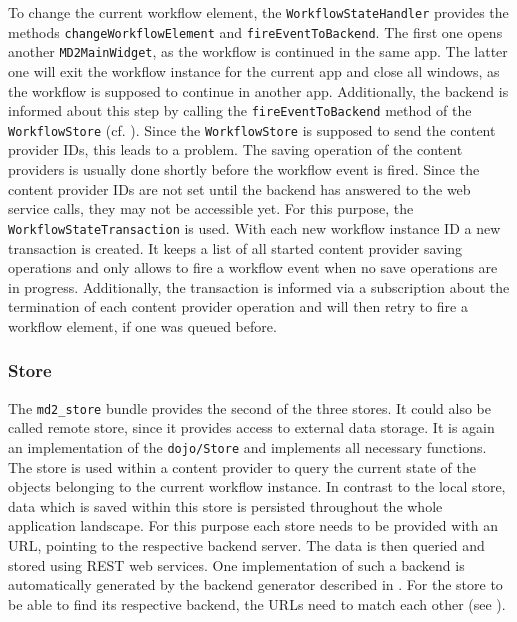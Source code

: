 To change the current workflow element, the \lstinline|WorkflowStateHandler| provides the methods \lstinline|changeWorkflowElement| and \lstinline|fireEventToBackend|. 
The first one opens another \lstinline|MD2MainWidget|, as the workflow is continued in the same app.
The latter one will exit the workflow instance for the current app and close all windows, as the workflow is supposed to continue in another app. Additionally, the backend is informed about this step by calling the \lstinline|fireEventToBackend| method of the \lstinline|WorkflowStore| (cf. ). Since the \lstinline|WorkflowStore| is supposed to send the content provider IDs, this leads to a problem. 
The saving operation of the content providers is usually done shortly before the workflow event is fired. Since the content provider IDs are not set until the backend has answered to the web service calls, they may not be accessible yet. For this purpose, the \lstinline|WorkflowStateTransaction| is used. 
With each new workflow instance ID a new transaction is created. It keeps a list of all started content provider saving operations and only allows to fire a workflow event when no save operations are in progress. Additionally, the transaction is informed via a subscription about the termination of each content provider operation and will then retry to fire a workflow element, if one was queued before.

\subsubsection{Store}\label{store}

The \lstinline|md2_store| bundle provides the second of the three stores. It could also be called remote store, since it provides access to external data storage. It is again an implementation of the \lstinline|dojo/Store| and implements all necessary functions. The store is used within a content provider to query the current state of the objects belonging to the current workflow instance. In contrast to the local store, data which is saved within this store is persisted throughout the whole application landscape. For this purpose each store needs to be provided with an URL, pointing to the respective backend server. The data is then queried and stored using REST web services. One implementation of such a backend is automatically generated by the backend generator described in . For the store to be able to find its respective backend, the URLs need to match each other (see ). 

